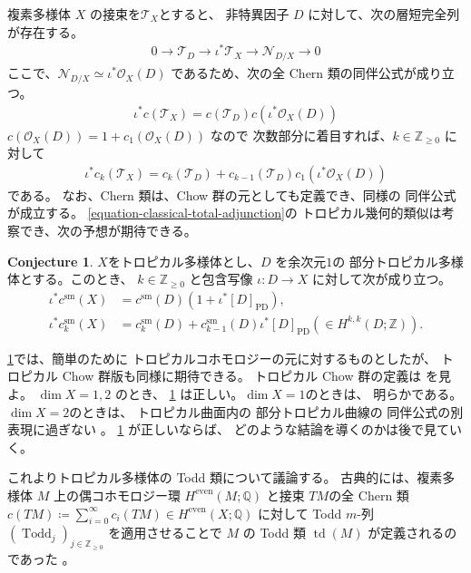 \documentclass[a4paper,dvipdfmx,reqno,12pt]{amsart}
\theoremstyle{definition}
\newtheorem{conjecture}[theorem]{Conjecture}
\newcommand{\deq}{\coloneqq}
\newcommand{\opn}[1]{\operatorname{#1}}
\newcommand{\PD}[1]{[#1]_{\mathrm{PD}}}
\numberwithin{equation}{section}
\begin{document}
複素多様体 $X$ の接束を$\mathcal{T}_X$とすると、
非特異因子 $D$ に対して、次の層短完全列が存在する。
\begin{align}
0 \to \mathcal{T}_{D}\to \iota^{*}\mathcal{T}_X
\to \mathcal{N}_{D/X}\to 0
\end{align}
ここで、$\mathcal{N}_{D/X}\simeq \iota^{*}\mathcal{O}_X(D)$
であるため、次の全 Chern 類の同伴公式が成り立つ。
\begin{align}
\label{equation-classical-total-adjunction}
\iota^{*}c(\mathcal{T}_X)
=c(\mathcal{T}_{D})c(\iota^{*}\mathcal{O}_X(D))
\end{align}
$c(\mathcal{O}_X(D))=1+c_1(\mathcal{O}_X(D))$ なので
次数部分に着目すれば、$k\in \mathbb{Z}_{\geq 0}$
に対して
\begin{align}
\label{equation-classical-total-adjunction}
\iota^{*}c_k(\mathcal{T}_X)
=c_{k}(\mathcal{T}_{D})+
c_{k-1}(\mathcal{T}_{D})c_1(\iota^{*}\mathcal{O}_X(D))
\end{align}
である。
なお、Chern 類は、Chow 群の元としても定義でき、同様の
同伴公式が成立する。
\eqref{equation-classical-total-adjunction}の
トロピカル幾何的類似は考察でき、次の予想が期待できる。
\begin{conjecture}
\label{conjecture-grr-divisor}
$X$をトロピカル多様体とし、$D$ を余次元$1$の
部分トロピカル多様体とする。このとき、
$k\in \mathbb{Z}_{\geq 0}$ と包含写像
$\iota\colon D \to X$ に対して次が成り立つ。
\begin{align}
\label{equation-total-adjunction}
\iota^{*}c^{\mathrm{sm}}(X)&=c^{\mathrm{sm}}(D)
(1+\iota^{*}\PD{D}), \\ 
\iota^{*}c^{\mathrm{sm}}_k(X)&=c^{\mathrm{sm}}_k(D)+
c^{\mathrm{sm}}_{k-1}(D)\iota^{*}\PD{D}(\in H^{k,k}(D;\mathbb{Z})).
\end{align}
\end{conjecture}
\cref{conjecture-grr-divisor}では、簡単のために
トロピカルコホモロジーの元に対するものとしたが、
トロピカル Chow 群版も同様に期待できる。
トロピカル Chow 群の定義は
\cite[Definition 3.30]{shaw2015tropical} を見よ。
$\dim X=1,2$ のとき、
\cref{conjecture-grr-divisor}
は正しい。$\dim X=1$のときは、
明らかである。
$\dim X=2$のときは、
トロピカル曲面内の
部分トロピカル曲線の
同伴公式の別表現に過ぎない
\cite[Theorem 6]{shaw2015tropical}。
\cref{conjecture-grr-divisor} 
が正しいならば、
どのような結論を導くのかは後で見ていく。

これよりトロピカル多様体の Todd 類について議論する。
古典的には、複素多様体 $M$ 上の偶コホモロジー環
$H^{\mathrm{even}}(M;\mathbb{Q})$
と接束 $TM$の全 Chern 類 
$c(TM)\deq \sum_{i=0}^{\infty}c_i(TM)\in 
H^{\mathrm{even}}(X;\mathbb{Q})$
に対して
Todd $m$-列 $(\opn{Todd}_j)_{j\in \mathbb{Z}_{\geq 0}}$
を適用させることで $M$ の Todd 類
$\opn{td}(M)$
が定義されるのであった
\cite[]{MR1335917}。
 
\end{document}

